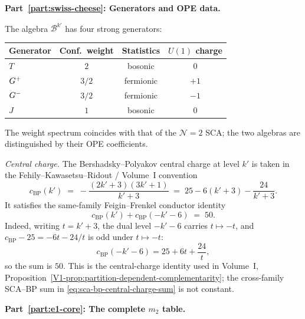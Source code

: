 \begin{computation}[The ordered bar complex of the
Bershadsky--Polyakov algebra
$\mathcal{B}^{k'} = W_{k'}(\mathfrak{sl}_3,f_{\min})$;
\ClaimStatusProvedHere]
\label{comp:ordered-bar-bp}

\medskip
\noindent\textbf{Part~\ref{part:swiss-cheese}: Generators and OPE data.}

The algebra $\mathcal{B}^{k'}$ has four strong generators:
\begin{center}
\renewcommand{\arraystretch}{1.15}
\begin{tabular}{lccc}
\textbf{Generator} & \textbf{Conf.\ weight} &
\textbf{Statistics} & \textbf{$U(1)$ charge} \\
\hline
$T$ & $2$ & bosonic & $0$ \\
$G^+$ & $3/2$ & fermionic & $+1$ \\
$G^-$ & $3/2$ & fermionic & $-1$ \\
$J$ & $1$ & bosonic & $0$
\end{tabular}
\end{center}
The weight spectrum coincides with that of the $\mathcal N=2$
SCA; the two algebras are distinguished by their OPE
coefficients.

\emph{Central charge.}
The Bershadsky--Polyakov central charge at level $k'$ is taken in
the Fehily--Kawasetsu--Ridout / Volume~I convention
\begin{equation}\label{eq:bp-central-charge-FKR}
c_{\mathrm{BP}}(k')
\;=\;
-\frac{(2k'+3)(3k'+1)}{k'+3}
\;=\;
25-6(k'+3)-\frac{24}{k'+3}.
\end{equation}
It satisfies the same-family Feigin--Frenkel conductor identity
\begin{equation}\label{eq:bp-FKR-complementarity}
c_{\mathrm{BP}}(k')+c_{\mathrm{BP}}(-k'-6)
\;=\; 50.
\end{equation}
Indeed, writing $t=k'+3$, the dual level $-k'-6$ carries
$t\mapsto -t$, and $c_{\mathrm{BP}}-25 = -6t-24/t$ is odd under
$t\mapsto -t$:
\[
c_{\mathrm{BP}}(-k'-6)
=25+6t+\frac{24}{t},
\]
so the sum is $50$.
This is the central-charge identity used in Volume~I,
Proposition~\ref*{V1-prop:partition-dependent-complementarity};
the cross-family SCA--BP sum in
\eqref{eq:sca-bp-central-charge-sum} is not constant.

\medskip
\noindent\textbf{Part~\ref{part:e1-core}: The complete $m_2$ table.}


\end{computation}
